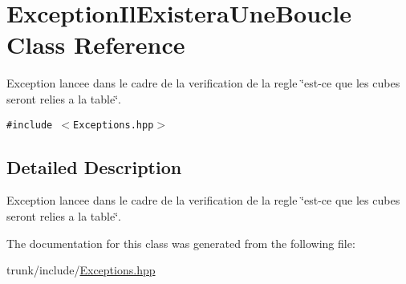 \hypertarget{classExceptionIlExisteraUneBoucle}{
\section{ExceptionIlExisteraUneBoucle Class Reference}
\label{classExceptionIlExisteraUneBoucle}
}
Exception lancee dans le cadre de la verification de la regle \char`\"{}est-ce que les cubes seront relies a la table\char`\"{}.  


{\tt \#include $<$Exceptions.hpp$>$}



\subsection{Detailed Description}
Exception lancee dans le cadre de la verification de la regle \char`\"{}est-ce que les cubes seront relies a la table\char`\"{}. 

The documentation for this class was generated from the following file:\begin{CompactItemize}
\item 
trunk/include/\hyperlink{Exceptions_8hpp}{Exceptions.hpp}\end{CompactItemize}
